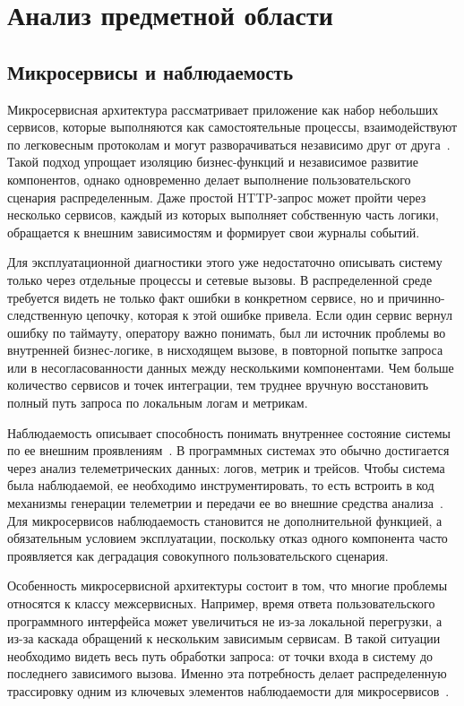 \chapter{Анализ предметной области}
\label{chap:domain-analysis}

\section{Микросервисы и наблюдаемость}

Микросервисная архитектура рассматривает приложение как набор небольших сервисов,
которые выполняются как самостоятельные процессы, взаимодействуют по легковесным
протоколам и могут разворачиваться независимо друг от друга~\cite{fowlerMicroservices,richardsonMicroservicePattern}.
Такой подход упрощает изоляцию бизнес-функций и независимое развитие компонентов,
однако одновременно делает выполнение пользовательского сценария распределенным.
Даже простой HTTP-запрос может пройти через несколько сервисов, каждый из которых
выполняет собственную часть логики, обращается к внешним зависимостям и формирует
свои журналы событий.

Для эксплуатационной диагностики этого уже недостаточно описывать систему только
через отдельные процессы и сетевые вызовы. В распределенной среде требуется видеть
не только факт ошибки в конкретном сервисе, но и причинно-следственную цепочку,
которая к этой ошибке привела. Если один сервис вернул ошибку по таймауту,
оператору важно понимать, был ли источник проблемы во внутренней бизнес-логике,
в нисходящем вызове, в повторной попытке запроса или в несогласованности данных
между несколькими компонентами. Чем больше количество сервисов и точек
интеграции, тем труднее вручную восстановить полный путь запроса по локальным
логам и метрикам.

Наблюдаемость описывает способность понимать внутреннее состояние системы по ее
внешним проявлениям~\cite{otelWhatIs,otelObservabilityPrimer}. В программных
системах это обычно достигается через анализ телеметрических данных: логов,
метрик и трейсов. Чтобы система была наблюдаемой, ее необходимо инструментировать,
то есть встроить в код механизмы генерации телеметрии и передачи ее во внешние
средства анализа~\cite{otelWhatIs}. Для микросервисов наблюдаемость становится не
дополнительной функцией, а обязательным условием эксплуатации, поскольку отказ
одного компонента часто проявляется как деградация совокупного пользовательского
сценария.

Особенность микросервисной архитектуры состоит в том, что многие проблемы
относятся к классу межсервисных. Например, время ответа пользовательского
программного интерфейса может увеличиться не из-за локальной перегрузки, а из-за
каскада обращений к нескольким зависимым сервисам. В такой ситуации необходимо
видеть весь путь обработки запроса: от точки входа в систему до последнего
зависимого вызова. Именно эта потребность делает распределенную трассировку одним
из ключевых элементов наблюдаемости для микросервисов~\cite{otelSignals,jaegerArchitecture}.

